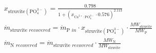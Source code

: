 \begin{refsection}[referencesCh6]
\begin{align}
	& x_{\text{struvite} \left(\text{PO}_{4}^{3-}\right) }= \frac{0.798}{1+\left(x_{\text{Ca}^{2+}:\text{PO}_{4}^{3-}} \cdot 0.576\right)^{2.113}} \label{eq:sigmoidal_Ca_StrYieldManuscript}
	\\
	& \dot{m}_{\text{struvite } recovered} = \dot{m}_{\text{P } in}  \cdot x_{\text{struvite} \left(\text{PO}_{4}^{3-}\right) } \cdot \frac{MW_{\text{struvite}}}{MW_{\text{P}}} \label{eq:Struvite_MultiformManuscript}
	\\
	& \dot{m}_{\text{N } recovered} =  \dot{m}_{\text{struvite } recovered} \cdot \frac{MW_{\text{N}}}{MW_{\text{struvite}}} \label{eq:N_MultiformManuscript}
\end{align} 



\end{refsection}
